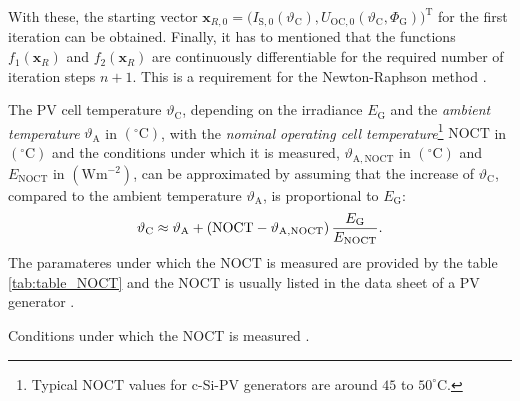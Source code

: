 With these, the starting vector $\mathrm{\mathbf{x}}_{R,0} = \big( I_\mathrm{S,0}(\vartheta_{\mathrm{C}}), U_\mathrm{OC,0}(\vartheta_{\mathrm{C}}, \Phi_{\mathrm{G}}) \big)^{\mathrm T}$ for the first iteration can be obtained. Finally, it has to mentioned that the functions $f_1(\mathrm{\mathbf{x}}_R)$ and $f_2(\mathrm{\mathbf{x}}_R)$ are continuously differentiable for the required number of iteration steps $n + 1$. This is a requirement for the Newton-Raphson method \cite{Schwarz:2011, Rudolf:2014, Taschner:2014, Mertens:2015, Wagner:2018, Kugi:2021}.

The PV cell temperature $\vartheta_{\mathrm{C}}$, depending on the irradiance $E_{\mathrm{G}}$ and the \emph{ambient temperature} $\vartheta_{\mathrm{A}}$ in $\left( ^\circ \mathrm{C} \right)$, with the \emph{nominal operating cell temperature}\footnote{Typical $\mathrm{NOCT}$ values for c-Si-PV generators are around $45$ to $50^\circ \mathrm{C}$.} $\mathrm{NOCT}$ in $\left( ^\circ \mathrm{C} \right)$ and the conditions under which it is measured, $\vartheta_{\mathrm{A,NOCT}}$ in $\left( ^\circ \mathrm{C} \right)$ and $E_{\mathrm{NOCT}}$ in $\left( \mathrm{W} \mathrm{m}^{-2} \right)$, can be approximated by assuming that the increase of $\vartheta_{\mathrm{C}}$, compared to the ambient temperature $\vartheta_{\mathrm{A}}$, is proportional to $E_{\mathrm{G}}$:
	\begin{equation} \label{eq:cell_temp}
	\centering
		\vartheta_{\mathrm{C}} \approx \vartheta_{\mathrm{A}} + \left(\mathrm{NOCT} - \vartheta_{\mathrm{A,NOCT}}\right) \frac{E_{\mathrm{G}}}{E_{\mathrm{NOCT}}} \text{.}
	\end{equation}
The paramateres under which the $\mathrm{NOCT}$ is measured are provided by the table \ref{tab:table_NOCT} and the $\mathrm{NOCT}$ is usually listed in the data sheet of a PV generator \cite{Mertens:2015}.
\begin{table}[h!]
	\centering
	
	\caption{Conditions under which the NOCT is measured \cite{Mertens:2015}.}
	\label{tab:table_NOCT}
\end{table}

